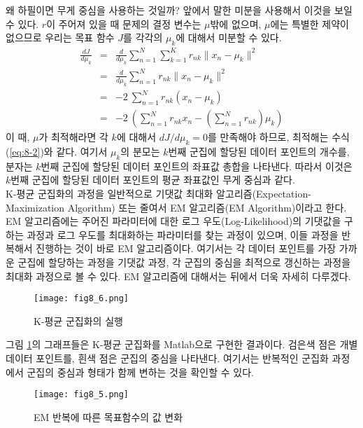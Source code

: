 \documentclass[a4paper]{oblivoir}
\begin{document}
왜 하필이면 무게 중심을 사용하는 것일까? 앞에서 말한 미분을 사용해서 이것을 보일 수 있다. $r$이 주어져 있을 때 문제의 결정 변수는 $\mu$밖에 없으며, $\mu$에는 특별한 제약이 없으므로 우리는 목표 함수 $J$를 각각의 $\mu_k$에 대해서 미분할 수 있다. 
\begin{eqnarray}
\frac{dJ}{d\mu_k} & = & \frac{d}{d\mu_k} \sum_{n=1}^{N} \sum_{k=1}^{K} r_{nk} \lVert x_{n} - \mu_{k} \rVert^{2} \nonumber \\
& = & \frac{d}{d\mu_k} \sum_{n=1}^{N} r_{nk} \lVert x_{n} - \mu_{k} \rVert^{2} \nonumber \\
& = & -2 \ \sum_{n=1}^{N} r_{nk} (x_{n} - \mu_{k}) \nonumber \\
& = & -2 \ (\sum_{n=1}^{N} r_{nk}x_{n} - (\sum_{n=1}^{N} r_{nk})\mu_{k} ) \label{eq:8-3}
\end{eqnarray}
이 때, $\mu$가 최적해라면 각 $k$에 대해서 ${dJ}/{d\mu_k}=0$를 만족해야 하므로, 최적해는 수식 (\ref{eq:8-2})와 같다. 여기서 $\mu_{k}$의 분모는 $k$번째 군집에 할당된 데이터 포인트의 개수를, 분자는 $k$번째 군집에 할당된 데이터 포인트의 좌표값 총합을 나타낸다. 따라서 이것은 $k$번째 군집에 할당된 데이터 포인트의 평균 좌표값인 무게 중심과 같다. \\

K-평균 군집화의 과정을 일반적으로 기댓값 최대화 알고리즘(Expectation-Maximization Algorithm) 또는 줄여서 EM 알고리즘(EM Algorithm)이라고 한다. EM 알고리즘에는 주어진 파라미터에 대한 로그 우도(Log-Likelihood)의 기댓값을 구하는 과정과 로그 우도를 최대화하는 파라미터를 찾는 과정이 있으며, 이들 과정을 반복해서 진행하는 것이 바로 EM 알고리즘이다. 여기서는 각 데이터 포인트를 가장 가까운 군집에 할당하는 과정을 기댓값 과정, 각 군집의 중심을 최적으로 갱신하는 과정을 최대화 과정으로 볼 수 있다. EM 알고리즘에 대해서는 뒤에서 더욱 자세히 다루겠다. \\

\begin{figure}[ht] \centering 
\texttt{[image: fig8\_6.png]} 
\caption{K-평균 군집화의 실행}
\label{fig:8-6}
\end{figure} 

그림 \ref{fig:8-6}의 그래프들은 K-평균 군집화를 Matlab으로 구현한 결과이다. 검은색 점은 개별 데이터 포인트를, 흰색 점은 군집의 중심을 나타낸다. 여기서는 반복적인 군집화 과정에서 군집의 중심과 형태가 함께 변하는 것을 확인할 수 있다. \\

\begin{figure}[ht] \centering 
\texttt{[image: fig8\_5.png]} 
\caption{EM 반복에 따른 목표함수의 값 변화}
\label{fig:8-5}
\end{figure} 
\end{document}

